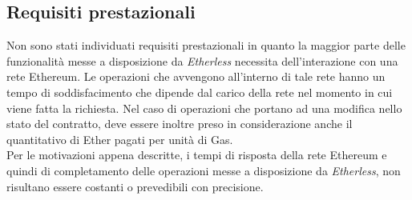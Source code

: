 \subsection{Requisiti prestazionali}
Non sono stati individuati requisiti prestazionali in quanto la maggior parte delle funzionalità messe a disposizione da \textit{Etherless} necessita dell'interazione con una rete Ethereum. Le operazioni che avvengono all'interno di tale rete hanno un tempo di soddisfacimento che dipende dal carico della rete nel momento in cui viene fatta la richiesta. Nel caso di operazioni che portano ad una modifica nello stato del contratto, deve essere inoltre preso in considerazione anche il quantitativo di Ether pagati per unità di Gas. \\ 
Per le motivazioni appena descritte, i tempi di risposta della rete Ethereum e quindi di completamento delle operazioni messe a disposizione da \textit{Etherless}, non risultano essere costanti o prevedibili con precisione. 